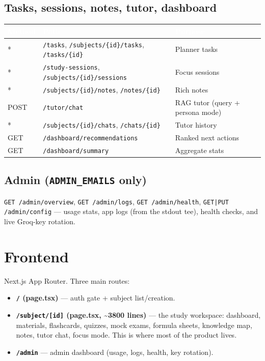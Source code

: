 \documentclass[11pt,a4paper]{article}
\newcommand{\code}[1]{\colorbox{fbCream}{\texttt{\small #1}}}
\newcommand{\hdr}[1]{\textcolor{white}{\bfseries #1}}
\begin{document}
\subsection{Tasks, sessions, notes, tutor, dashboard}
\begin{tabularx}{\textwidth}{l l L}
\toprule
{}\hdr{Method} & \hdr{Path} & \hdr{Purpose} \\
\midrule
*     & \code{/tasks}, \code{/subjects/\{id\}/tasks}, \code{/tasks/\{id\}} & Planner tasks \\
*     & \code{/study-sessions}, \code{/subjects/\{id\}/sessions} & Focus sessions \\
*     & \code{/subjects/\{id\}/notes}, \code{/notes/\{id\}} & Rich notes \\
POST  & \code{/tutor/chat} & RAG tutor (query + persona mode) \\
*     & \code{/subjects/\{id\}/chats}, \code{/chats/\{id\}} & Tutor history \\
GET   & \code{/dashboard/recommendations} & Ranked next actions \\
GET   & \code{/dashboard/summary} & Aggregate stats \\
\bottomrule
\end{tabularx}

\subsection{Admin (\code{ADMIN\_EMAILS} only)}
\code{GET /admin/overview}, \code{GET /admin/logs}, \code{GET /admin/health},
\code{GET|PUT /admin/config} --- usage stats, app logs (from the stdout tee),
health checks, and live Groq-key rotation.

\section{Frontend}

Next.js App Router. Three main routes:

\begin{itemize}[leftmargin=1.4em]
\item \textbf{\code{/} (page.tsx)} --- auth gate + subject list/creation.
\item \textbf{\code{/subject/[id]} (page.tsx, \textasciitilde 3800 lines)} --- the
  study workspace: dashboard, materials, flashcards, quizzes, mock exams, formula
  sheets, knowledge map, notes, tutor chat, focus mode. This is where most of the
  product lives.
\item \textbf{\code{/admin}} --- admin dashboard (usage, logs, health, key
  rotation).
\end{itemize}
\end{document}
